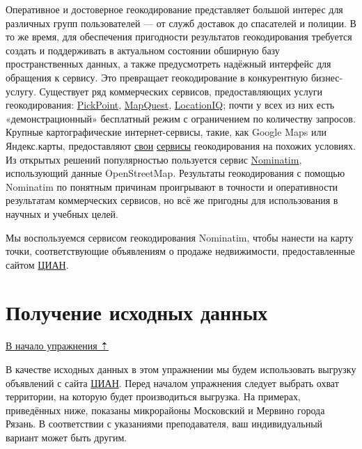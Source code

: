 \documentclass[
  12pt,
]{book}
\begin{document}
Оперативное и достоверное геокодирование представляет большой интерес для различных групп пользователей --- от служб доставок до спасателей и полиции. В то же время, для обеспечения пригодности результатов геокодирования требуется создать и поддерживать в актуальном состоянии обширную базу пространственных данных, а также предусмотреть надёжный интерфейс для обращения к сервису. Это превращает геокодирование в конкурентную бизнес-услугу. Существует ряд коммерческих сервисов, предоставляющих услуги геокодирования: \href{https://pickpoint.io/ru}{PickPoint}, \href{https://developer.mapquest.com/documentation/geocoding-api/}{MapQuest}, \href{https://locationiq.com/geocoding}{LocationIQ}; почти у всех из них есть «демонстрационный» бесплатный режим с ограничением по количеству запросов. Крупные картографические интернет-сервисы, такие, как Google Maps или Яндекс.карты, предоставляют \href{https://developers.google.com/maps/documentation/javascript/geocoding}{свои} \href{https://yandex.ru/dev/maps/geocoder/doc/desc/concepts/about.html}{сервисы} геокодирования на похожих условиях. Из открытых решений популярностью пользуется сервис \href{https://nominatim.org/}{Nominatim}, использующий данные OpenStreetMap. Результаты геокодирования с помощью Nominatim по понятным причинам проигрывают в точности и оперативности результатам коммерческих сервисов, но всё же пригодны для использования в научных и учебных целей.

Мы воспользуемся сервисом геокодирования Nominatim, чтобы нанести на карту точки, соответствующие объявлениям о продаже недвижимости, предоставленные сайтом \href{https://www.cian.ru/}{ЦИАН}.

\hypertarget{geocoding-input}{%
\section{Получение исходных данных}\label{geocoding-input}}

\protect\hyperlink{geocoding}{В начало упражнения ⇡}

В качестве исходных данных в этом упражнении мы будем использовать выгрузку объявлений с сайта \href{https://www.cian.ru/}{ЦИАН}. Перед началом упражнения следует выбрать охват территории, на которую будет производиться выгрузка. На примерах, приведённых ниже, показаны микрорайоны Московский и Мервино города Рязань. В соответствии с указаниями преподавателя, ваш индивидуальный вариант может быть другим.
\end{document}
